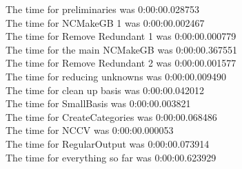 \documentclass[rep10,leqno]{report}
\begin{document}
\noindent
The time for preliminaries was 0:00:00.028753\\
The time for NCMakeGB 1 was 0:00:00.002467\\
The time for Remove Redundant 1 was 0:00:00.000779\\
The time for the main NCMakeGB was 0:00:00.367551\\
The time for Remove Redundant 2 was 0:00:00.001577\\
The time for reducing unknowns was 0:00:00.009490\\
The time for clean up basis was 0:00:00.042012\\
The time for SmallBasis was 0:00:00.003821\\
The time for CreateCategories was 0:00:00.068486\\
The time for NCCV was 0:00:00.000053\\
The time for RegularOutput was 0:00:00.073914\\
The time for everything so far was 0:00:00.623929\\
\end{document}
